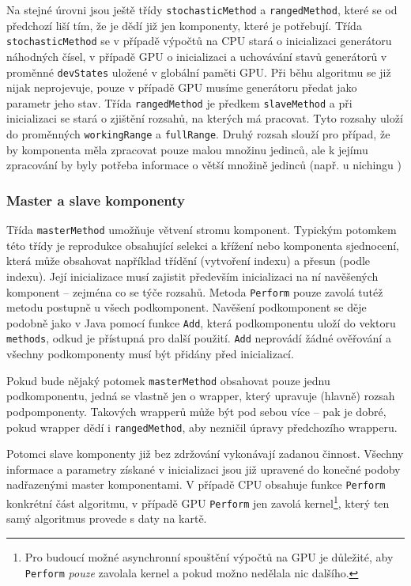 Na stejné úrovni jsou ještě třídy \texttt{stochasticMethod} a \texttt{rangedMethod}, které se od předchozí liší tím, že je dědí již jen komponenty, které je potřebují. Třída \texttt{stochasticMethod} se v případě výpočtů na CPU stará o inicializaci generátoru náhodných čísel, v případě GPU o inicializaci a uchovávání stavů generátorů v proměnné \texttt{devStates} uložené v globální paměti GPU. Při běhu algoritmu se již nijak neprojevuje, pouze v případě GPU musíme generátoru předat jako parametr jeho stav. Třída \texttt{rangedMethod} je předkem \texttt{slaveMethod} a při inicializaci se stará o zjištění rozsahů, na kterých má pracovat. Tyto rozsahy uloží do proměnných \texttt{workingRange} a \texttt{fullRange}. Druhý rozsah slouží pro případ, že by komponenta měla zpracovat pouze malou množinu jedinců, ale k jejímu zpracování by byly potřeba informace o větší množině jedinců (např. u nichingu )

\subsubsection{Master a slave komponenty}

Třída \texttt{masterMethod} umožňuje větvení stromu komponent. Typickým potomkem této třídy je reprodukce obsahující selekci a křížení nebo komponenta sjednocení, která může obsahovat například třídění (vytvoření indexu) a přesun (podle indexu). Její inicializace musí zajistit především inicializaci na ní navěšených komponent -- zejména co se týče rozsahů. Metoda \texttt{Perform} pouze zavolá tutéž metodu postupně u všech podkomponent. Navěšení podkomponent se děje podobně jako v Java pomocí funkce \texttt{Add}, která podkomponentu uloží do vektoru \texttt{methods}, odkud je přístupná pro další použití. \texttt{Add} neprovádí žádné ověřování a všechny podkomponenty musí být přidány před inicializací.

Pokud bude nějaký potomek \texttt{masterMethod} obsahovat pouze jednu podkomponentu, jedná se vlastně jen o wrapper, který upravuje (hlavně) rozsah podpomponenty. Takových wrapperů může být pod sebou více -- pak je dobré, pokud wrapper dědí i \texttt{rangedMethod}, aby nezničil úpravy předchozího wrapperu. \vspace{0.2cm}

Potomci slave komponenty již bez zdržování vykonávají zadanou činnost. Všechny informace a parametry získané v inicializaci jsou již upravené do konečné podoby nadřazenými master komponentami. V případě CPU obsahuje funkce \texttt{Perform} konkrétní část algoritmu, v případě GPU \texttt{Perform} jen zavolá kernel\footnote{Pro budoucí možné asynchronní spouštění výpočtů na GPU je důležité, aby \texttt{Perform} \emph{pouze} zavolala kernel a pokud možno nedělala nic dalšího.}, který ten samý algoritmus provede s daty na kartě.

